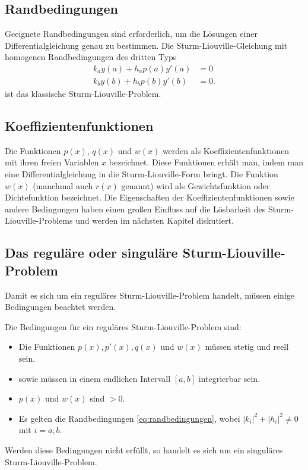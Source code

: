 \subsection{Randbedingungen\label{sub:was-ist-das-slp-randbedingungen}}
Geeignete Randbedingungen sind erforderlich, um die Lösungen einer
Differentialgleichung genau zu bestimmen.
Die Sturm-Liouville-Gleichung mit homogenen Randbedingungen des dritten Typs
\begin{equation}
	\begin{aligned}
		\label{eq:randbedingungen}
		k_a y(a) + h_a p(a) y'(a) &= 0 \\
		k_b y(b) + h_b p(b) y'(b) &= 0.
	\end{aligned}
\end{equation}
ist das klassische Sturm-Liouville-Problem.


\subsection{Koeffizientenfunktionen\label{sub:koeffizientenfunktionen}}
Die Funktionen $p(x)$, $q(x)$ und $w(x)$ werden als Koeffizientenfunktionen mit
ihren freien Variablen $x$ bezeichnet.
Diese Funktionen erhält man, indem man eine Differentialgleichung in die Sturm-Liouville-Form bringt.
Die Funktion $w(x)$ (manchmal auch $r(x)$ genannt) wird als Gewichtsfunktion
oder Dichtefunktion bezeichnet.
Die Eigenschaften der Koeffizientenfunktionen sowie andere Bedingungen haben einen großen Einfluss auf die Lösbarkeit des Sturm-Liouville-Problems und werden im nächsten Kapitel diskutiert. 



%
%

\subsection{Das reguläre oder singuläre Sturm-Liouville-Problem
\label{sub:reguläre_sturm_liouville_problem}}
Damit es sich um ein reguläres Sturm-Liouville-Problem handelt, müssen einige
Bedingungen beachtet werden.
\begin{definition}
	\label{def:reguläres_sturm-liouville-problem}
	Die Bedingungen für ein reguläres Sturm-Liouville-Problem sind:
	\begin{itemize}
		\item Die Funktionen $p(x), p'(x), q(x)$ und $w(x)$ müssen stetig und
		reell sein.
		\item sowie müssen in einem endlichen Intervall $[a,b]$ integrierbar
		sein.
		\item $p(x)$ und $w(x)$ sind $>0$.
		\item Es gelten die Randbedingungen \eqref{eq:randbedingungen}, wobei
		$|k_i|^2 + |h_i|^2\ne 0$ mit $i=a,b$.
	\end{itemize}
\end{definition}
Werden diese Bedingungen nicht erfüllt, so handelt es sich um ein singuläres Sturm-Liouville-Problem.

